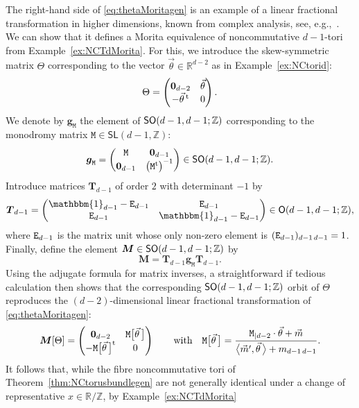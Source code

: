 \documentclass[10pt,a4paper]{amsart}
\numberwithin{equation}{section}
\newcommand{\Z}{\zed}
\newcommand{\mbf}[1]{{\boldsymbol {#1} }}
\newcommand{\unit}{\mathbbm{1}} 			%
\newcommand{\sfSL}{\mathsf{SL}}
\newcommand{\ttM}{\mathtt{M}}
\newcommand{\R}{\real}
\newcommand{\zed}{{\mathbb Z}} %
\newcommand{\real}{{\mathbb R}} %
\begin{document}
\begin{Remark}
\label{rem:MoritaKK}
The right-hand side of \eqref{eq:thetaMoritagen} is an example of a
linear fractional transformation in higher dimensions, known from
complex analysis, see, e.g.,~\cite{Cowen2000}. We can show that it defines a Morita equivalence of noncommutative $d{-}1$-tori from
Example~\ref{ex:NCTdMorita}. For this, we introduce the skew-symmetric
matrix $\Theta$ corresponding to the vector $\vec\theta\in\R^{d-2}$ as
in Example~\ref{ex:NCtorid}:
\[
\Theta = \left(
\begin{matrix}
\mbf 0_{d-2} & \vec\theta \\ -\vec\theta\,^{\rm t} & 0
\end{matrix}
\right) .
\]
We denote by $\mbf g_{\ttM}$ the element of ${\sf SO}(d-1,d-1;\Z)$
corresponding to the monodromy matrix $\ttM\in\sfSL(d-1,\Z)$:
\[
\mbf g_{\ttM} = \left(
\begin{matrix}
\ttM & \mbf 0_{d-1} \\ \mbf 0_{d-1} & \big(\ttM^{\rm t}\big)^{-1}
\end{matrix}
\right)
\in {\sf SO}(d-1,d-1;\Z) .
\]
Introduce matrices $\mbf T_{d-1}$ of order $2$ with determinant $-1$
by
\[
\mbf T_{d-1} = \left(
\begin{matrix}
\unit_{d-1}-{\tt E}_{d-1} & {\tt E}_{d-1} \\ {\tt E}_{d-1} &
\unit_{d-1}-{\tt E}_{d-1}
\end{matrix}
\right) \in {\sf O}(d-1,d-1;\Z) ,
\]
where ${\tt E}_{d-1}$ is the matrix unit whose only
non-zero element is $({\tt E}_{d-1})_{d-1\,d-1} = 1$.
Finally, define the element $\mbf M\in{\sf SO}(d-1,d-1;\Z)$ by
\[
\mbf M = \mbf T_{d-1} \mbf g_{\ttM} \mbf T_{d-1} .
\]
Using the adjugate formula
for matrix inverses, a straightforward if tedious calculation then shows that the
corresponding ${\sf SO}(d-1,d-1;\Z)$ orbit of $\Theta$ reproduces the
$(d{-}2)$-dimensional linear fractional transformation of
\eqref{eq:thetaMoritagen}:
\[
\mbf M[\Theta] = \left(
\begin{matrix}
\mbf 0_{d-2} & \ttM\big[\vec\theta\, \big] \\
-\ttM\big[\vec\theta\, \big]^{\rm t} & 0
\end{matrix}
\right) \qquad \mbox{with} \quad \ttM\big[\vec\theta\, \big] = \frac{\ttM_{|d-2}\cdot\vec\theta + \vec m}
{\big\langle \vec m',\vec\theta\, \big\rangle + m_{d-1 \,
 d-1}} .
\]
It follows that, while the fibre noncommutative
tori of Theorem~\ref{thm:NCtorusbundlegen} are not generally identical under a change of
representative $x\in\R/\Z$, by Example~\ref{ex:NCTdMorita}

\end{Remark}
\end{document}
